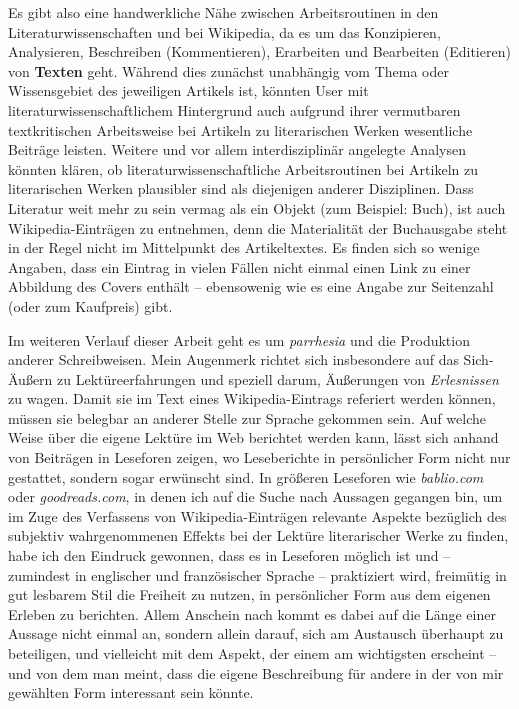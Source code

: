 \documentclass[fontsize=12pt]{scrartcl}
\begin{document}
Es gibt also eine handwerkliche N\"ahe zwischen Arbeitsroutinen in den Li\-te\-ra\-tur\-wissenschaften und bei Wi\-ki\-pe\-dia, da es um das Konzipieren, Ana\-lysieren, Beschrei\-ben (Kommentieren), Erarbei\-ten und Bearbei\-ten (Editieren) von \textbf{Texten} geht. W\"ahrend dies zun\"achst unabh\"angig vom Thema oder Wissensgebiet des jeweiligen Artikels ist, k\"onnten User mit li\-te\-ra\-tur\-wis\-sen\-schaft\-li\-chem Hintergrund auch aufgrund ihrer vermutbaren text\-kri\-ti\-schen Arbeitsweise bei Artikeln zu li\-te\-ra\-ri\-schen Werken we\-sent\-liche Beitr\"age leisten. Weitere und vor allem interdisziplin\"ar angelegte Ana\-lysen k\"onnten kl\"aren, ob li\-te\-ra\-tur\-wissenschaftliche Arbeitsroutinen bei Artikeln zu li\-te\-ra\-rischen Werken plausibler sind als diejenigen an\-de\-rer Disziplinen. Dass Li\-te\-ra\-tur weit mehr zu sein vermag als ein Objekt (zum Beispiel: Buch), ist auch Wi\-ki\-pe\-dia-Eintr\"agen zu entnehmen, denn die Materialit\"at der Buchausgabe steht in der Regel nicht im Mittelpunkt des Artikeltextes. Es finden sich so wenige Angaben, dass ein Eintrag in vielen F\"allen nicht einmal einen Link zu einer Abbildung des Co\-vers enth\"alt -- ebensowenig wie es eine Angabe zur Sei\-tenzahl (oder zum Kaufpreis) gibt.

Im weiteren Verlauf dieser Arbeit geht es um \textit{parrhesia} und die Produktion an\-de\-rer Schreibweisen. Mein Augenmerk richtet sich insbesondere auf das Sich-\"Au{\ss}ern zu Lekt\"ureerfah\-rungen und speziell darum, \"Au{\ss}erungen von \textit{Erlesnissen} zu wagen. Damit sie im Text eines Wi\-ki\-pe\-dia-Eintrags referiert werden k\"onnen, m\"ussen sie belegbar an an\-de\-rer Stelle zur Sprache gekommen sein. Auf welche Weise \"uber die eigene Lekt\"ure im Web berichtet werden kann, l\"asst sich anhand von Beitr\"agen in Leseforen zeigen, wo Leseberichte in pers\"onlicher Form nicht nur gestattet, sondern sogar erw\"unscht sind. In gr\"o{\ss}eren Leseforen wie \textit{bablio.com} oder \textit{goodreads.com}, in denen ich auf die Suche nach Aussagen gegangen bin, um im Zuge des Verfassens von Wi\-ki\-pe\-dia-Eintr\"agen relevante Aspekte bez\"uglich des subjektiv wahrgenommenen Effekts bei der Lekt\"ure li\-te\-ra\-rischer Werke zu finden, habe ich den Eindruck gewonnen, dass es in Leseforen m\"oglich ist und -- zumindest in eng\-lischer und franz\"osischer Sprache -- praktiziert wird, freim\"utig in gut lesbarem Stil die Freiheit zu nutzen, in pers\"onlicher Form aus dem eigenen Erleben zu berichten. Allem Anschein nach kommt es dabei auf die L\"ange einer Aussage nicht einmal an, sondern allein darauf, sich am Austausch \"uberhaupt zu beteiligen, und vielleicht mit dem Aspekt, der einem am wichtigsten erscheint -- und von dem man meint, dass die eigene Beschreibung f\"ur andere in der von mir gew\"ahlten Form interessant sein k\"onnte.
\end{document}
